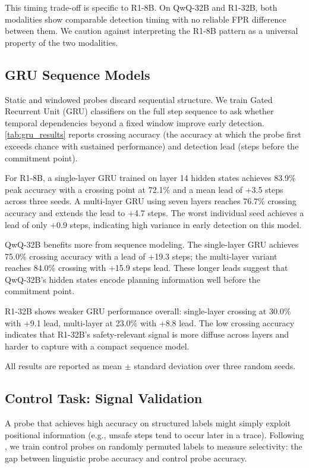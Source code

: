 This timing trade-off is specific to R1-8B. On QwQ-32B and R1-32B, both modalities show comparable detection timing with no reliable FPR difference between them. We caution against interpreting the R1-8B pattern as a universal property of the two modalities.

\subsection{GRU Sequence Models}
\label{sec:gru}

Static and windowed probes discard sequential structure. We train Gated Recurrent Unit (GRU) classifiers on the full step sequence to ask whether temporal dependencies beyond a fixed window improve early detection. \cref{tab:gru_results} reports crossing accuracy (the accuracy at which the probe first exceeds chance with sustained performance) and detection lead (steps before the commitment point).

For R1-8B, a single-layer GRU trained on layer 14 hidden states achieves 83.9\% peak accuracy with a crossing point at 72.1\% and a mean lead of +3.5 steps across three seeds. A multi-layer GRU using seven layers reaches 76.7\% crossing accuracy and extends the lead to +4.7 steps. The worst individual seed achieves a lead of only +0.9 steps, indicating high variance in early detection on this model.

QwQ-32B benefits more from sequence modeling. The single-layer GRU achieves 75.0\% crossing accuracy with a lead of +19.3 steps; the multi-layer variant reaches 84.0\% crossing with +15.9 steps lead. These longer leads suggest that QwQ-32B's hidden states encode planning information well before the commitment point.

R1-32B shows weaker GRU performance overall: single-layer crossing at 30.0\% with +9.1 lead, multi-layer at 23.0\% with +8.8 lead. The low crossing accuracy indicates that R1-32B's safety-relevant signal is more diffuse across layers and harder to capture with a compact sequence model.

All results are reported as mean $\pm$ standard deviation over three random seeds.

\subsection{Control Task: Signal Validation}
\label{sec:control}

A probe that achieves high accuracy on structured labels might simply exploit positional information (e.g., unsafe steps tend to occur later in a trace). Following \cite{hewitt2019control}, we train control probes on randomly permuted labels to measure selectivity: the gap between linguistic probe accuracy and control probe accuracy.

